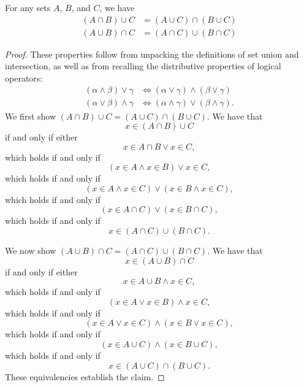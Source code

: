             \begin{majorEx}%
            For any sets $A$, $B$, and $C$, we have
            \begin{align*}
				(A \cap B) \cup C &= (A \cup C) \cap (B \cup C) \\
				(A \cup B) \cap C &= (A \cap C) \cup (B \cap C)
			\end{align*}
			\end{majorEx}
            \begin{proof}
            These properties follow from unpacking the definitions of set union and intersection, as well as from recalling the distributive properties of logical operators:
            \begin{align*}
            	(\alpha \land \beta) \lor \gamma &\iff (\alpha \lor \gamma) \land (\beta \lor \gamma) \\
            	(\alpha \lor \beta) \land \gamma &\iff (\alpha \land \gamma) \lor (\beta \land \gamma).
			\end{align*}
			We first show  $(A \cap B) \cup C = (A \cup C) \cap (B \cup C)$. We have that
            \[
            x \in (A \cap B) \cup C
            \]
            if and only if either 
            \[
            x \in A \cap B \lor x \in C,
            \] 
            which holds if and only if
            \[
            (x \in A \land x \in B) \lor x \in C,
            \]
			which holds if and only if 
            \[
           	(x \in A \land x \in C) \lor (x \in B \land x \in C), 
            \]
            which holds if and only if
            \[
            (x \in A \cap C) \lor (x \in B \cap C),
            \]
            which holds if and only if
            \[
            x \in (A \cap C) \cup (B \cap C).
            \]
            
            We now show  $(A \cup B) \cap C = (A \cap C) \cup (B \cap C)$. We have that
            \[
            x \in (A \cup B) \cap C
            \]
            if and only if either 
            \[
            x \in A \cup B \land x \in C,
            \] 
            which holds if and only if
            \[
            (x \in A \lor x \in B) \land x \in C,
            \]
			which holds if and only if 
            \[
           	(x \in A \lor x \in C) \land (x \in B \lor x \in C), 
            \]
            which holds if and only if
            \[
            (x \in A \cup C) \land (x \in B \cup C),
            \]
            which holds if and only if
            \[
            x \in (A \cup C) \cap (B \cup C).
            \]
            These equivalencies establish the claim.
			\end{proof}
            
